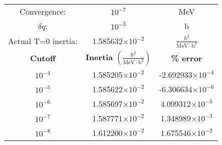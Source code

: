 \begin{tabular}{|ccc|}
	\hline Convergence: & $10^{-7}$ & MeV \\ 
	$\delta q$: & $10^{-3}$ & b \\ 
	Actual T=0 inertia: & 1.585632$\times10^{-2}$ & $\frac{\hbar^2}{\mathrm{MeV \cdot b}^2}$ \\ \hline
	\textbf{Cutoff} & \textbf{Inertia} $\left(\frac{\hbar^2}{\mathrm{MeV \cdot b}^2}\right)$ & \textbf{\% error} \\ \hline
	$10^{-4}$ & 1.585205$\times10^{-2}$ & -2.692933$\times10^{-4}$ \\
	$10^{-5}$ & 1.585622$\times10^{-2}$ & -6.306634$\times10^{-6}$ \\
	$10^{-6}$ & 1.585697$\times10^{-2}$ & 4.099312$\times10^{-5}$ \\
	$10^{-7}$ & 1.587771$\times10^{-2}$ & 1.348989$\times10^{-3}$ \\
	$10^{-8}$ & 1.612200$\times10^{-2}$ & 1.675546$\times10^{-2}$ \\ \hline
\end{tabular} 

